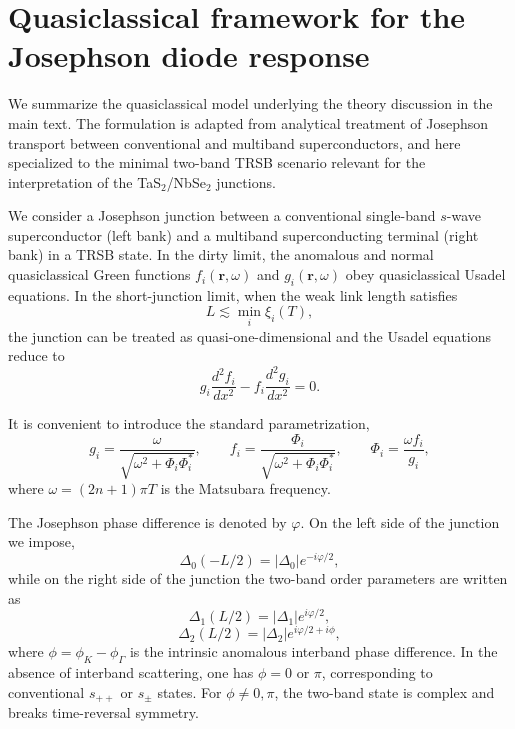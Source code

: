 \documentclass[twocolumn,secnumarabic,amssymb, nobibnotes, aps, prl, superscriptaddress]{revtex4-2}
\begin{document}
\section{Quasiclassical framework for the Josephson diode response}

We summarize the quasiclassical model underlying the theory discussion in the main text. The formulation is adapted from analytical treatment of Josephson transport between conventional and multiband superconductors, and here specialized to the minimal two-band TRSB scenario relevant for the interpretation of the TaS$_2$/NbSe$_2$ junctions.


We consider a Josephson junction between a conventional single-band $s$-wave superconductor (left bank) and a multiband superconducting terminal (right bank) in a TRSB state. In the dirty limit, the anomalous and normal quasiclassical Green functions $f_i(\mathbf{r},\omega)$ and $g_i(\mathbf{r},\omega)$ obey quasiclassical Usadel equations. In the short-junction limit, when the weak link length satisfies
\begin{equation}
L \lesssim \min_i \xi_i(T),
\end{equation}
the junction can be treated as quasi-one-dimensional and the Usadel equations reduce to
\begin{equation}
g_i \frac{d^2 f_i}{dx^2} - f_i \frac{d^2 g_i}{dx^2} = 0.
\label{eq:Usadel_short_SI}
\end{equation}

It is convenient to introduce the standard parametrization,
\begin{equation}
g_i=\frac{\omega}{\sqrt{\omega^2+\Phi_i\Phi_i^*}},
\qquad
f_i=\frac{\Phi_i}{\sqrt{\omega^2+\Phi_i\Phi_i^*}},
\qquad
\Phi_i=\frac{\omega f_i}{g_i},
\label{eq:Phi_param_SI}
\end{equation}
where $\omega = (2n+1)\pi T$ is the Matsubara frequency.

The Josephson phase difference is denoted by $\varphi$. On the left side of the junction we impose,
\begin{equation}
\Delta_0(-L/2)=|\Delta_0|e^{-i\varphi/2},
\label{eq:Delta0_bc_SI}
\end{equation}
while on the right side of the junction the two-band order parameters are written as
\begin{equation}
\Delta_1(L/2)=|\Delta_1|e^{i\varphi/2},
\label{eq:Delta1_bc_SI}
\end{equation}
\begin{equation}
\Delta_2(L/2)=|\Delta_2|e^{i\varphi/2+i\phi},
\label{eq:Delta2_bc_SI}
\end{equation}
where $\phi=\phi_{K}-\phi_{\Gamma}$ is the intrinsic anomalous interband phase difference. In the absence of interband scattering, one has $\phi=0$ or $\pi$, corresponding to conventional $s_{++}$ or $s_{\pm}$ states. For $\phi\neq 0,\pi$, the two-band state is complex and breaks time-reversal symmetry.
\end{document}

